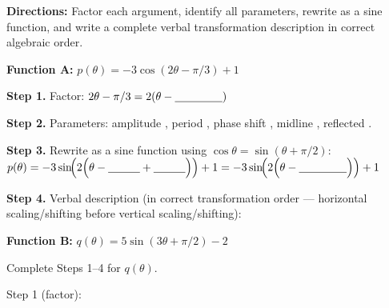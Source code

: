 \documentclass[10pt]{article}
\begin{document}
\begin{tcolorbox}[colback=white, colframe=black!40,
    title=\textbf{Tier E --- Extend},
    fonttitle=\bfseries, arc=2mm, left=3mm, right=3mm, top=2mm, bottom=2mm]

\textbf{Directions:} Factor each argument, identify all parameters, rewrite
as a sine function, and write a complete verbal transformation description in
correct algebraic order.

\vspace{6pt}
\textbf{Function A:} $p(\theta) = -3\cos(2\theta - \pi/3) + 1$

\vspace{4pt}
\textbf{Step 1.} Factor: $2\theta - \pi/3 = 2\!\left(\theta - \underline{\hspace{1.5cm}}\right)$

\vspace{4pt}
\textbf{Step 2.} Parameters: amplitude \underline{\hspace{1.5cm}}, period \underline{\hspace{1.5cm}},
phase shift \underline{\hspace{2cm}}, midline \underline{\hspace{1.5cm}}, reflected \underline{\hspace{1cm}}.

\vspace{4pt}
\textbf{Step 3.} Rewrite as a sine function using $\cos\theta = \sin(\theta + \pi/2)$:
\vspace{2pt}
$p(\theta) = -3\sin\!\Bigl(2\Bigl(\theta - \underline{\hspace{1cm}} + \underline{\hspace{1cm}}\Bigr)\Bigr) + 1
= -3\sin\!\Bigl(2\Bigl(\theta - \underline{\hspace{1.5cm}}\Bigr)\Bigr) + 1$

\vspace{4pt}
\textbf{Step 4.} Verbal description (in correct transformation order --- horizontal
scaling/shifting before vertical scaling/shifting):


\vspace{8pt}
\textbf{Function B:} $q(\theta) = 5\sin(3\theta + \pi/2) - 2$

Complete Steps 1--4 for $q(\theta)$.

\vspace{4pt}
Step 1 (factor): \underline{\hspace{6cm}}


\end{tcolorbox}
\end{document}
